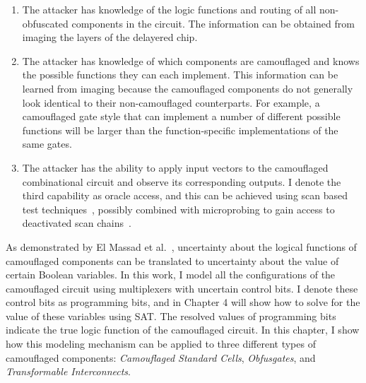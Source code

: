 \documentclass[proposal]{umassthesis}  %
\begin{document}
\begin{enumerate}
\item The attacker has knowledge of the logic functions and routing of all non-obfuscated components in the circuit. The information can be obtained from imaging the layers of the delayered chip.
\item The attacker has knowledge of which components are camouflaged and knows the possible functions they can each implement. This information can be learned from imaging because the camouflaged components do not generally look identical to their non-camouflaged counterparts. For example, a camouflaged gate style that can implement a number of different possible functions will be larger than the function-specific implementations of the same gates.%

\item The attacker has the ability to apply input vectors to the camouflaged combinational circuit and observe its corresponding outputs. I denote the third capability as oracle access, and this can be achieved using scan based test techniques~\cite{yang2004scan},  {possibly combined with microprobing to gain access to deactivated scan chains}~\cite{kommerling1999design}. %
\end{enumerate}

As demonstrated by El Massad et al.~\cite{elmassad-15}, uncertainty about the logical functions of camouflaged components can be translated to uncertainty about the value of certain Boolean variables. In this work, I model all the configurations of the camouflaged circuit using multiplexers with uncertain control bits. I denote these control bits as programming bits, and in Chapter 4 will show how to solve for the value of these variables using SAT.  The resolved values of programming bits indicate the true logic function of the camouflaged circuit.
In this chapter, I show how this modeling mechanism can be applied to three different types of camouflaged components: \textit{Camouflaged Standard Cells}, \textit{Obfusgates}, and \textit{Transformable Interconnects}.
\end{document}
